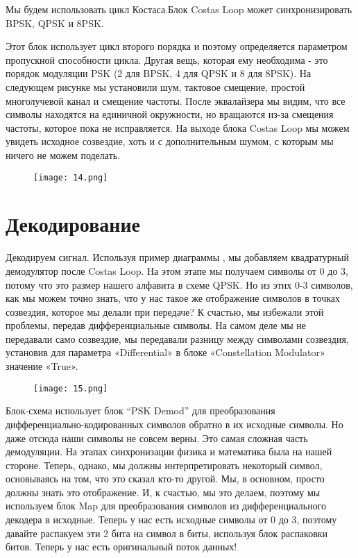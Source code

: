 \documentclass[a4paper,12pt]{report}
\begin{document}
Мы будем использовать цикл Костаса.Блок Costas Loop может синхронизировать BPSK, QPSK и 8PSK. 

Этот блок использует цикл второго порядка и поэтому определяется параметром пропускной способности цикла. Другая вещь, которая ему необходима - это порядок модуляции PSK (2 для BPSK, 4 для QPSK и 8 для 8PSK). На следующем рисунке мы установили шум, тактовое смещение, простой многолучевой канал и смещение частоты. После эквалайзера мы видим, что все символы находятся на единичной окружности, но вращаются из-за смещения частоты, которое пока не исправляется. На выходе блока Costas Loop мы можем увидеть исходное созвездие, хоть и с дополнительным шумом, с которым мы ничего не можем поделать. 

\begin{figure}[H]
        \centering
        \texttt{[image: 14.png]}
        \caption{}
        \label{fig:ig4_1}
\end{figure}

\section{Декодирование}

Декодируем сигнал. Используя пример диаграммы , мы добавляем квадратурный демодулятор после Costas Loop. На этом этапе мы получаем символы от 0 до 3, потому что это размер нашего алфавита в схеме QPSK. Но из этих 0-3 символов, как мы можем точно знать, что у нас такое же отображение символов в точках созвездия, которое мы делали при передаче? К счастью, мы избежали этой проблемы, передав дифференциальные символы. На самом деле мы не передавали само созвездие, мы передавали разницу между символами созвездия, установив для параметра «Differential» в блоке «Constellation Modulator» значение «True».  

\begin{figure}[H]
        \centering
        \texttt{[image: 15.png]}
        \caption{}
        \label{fig:ig4_1}
\end{figure}

Блок-схема использует блок “PSK Demod” для преобразования дифференциально-кодированных символов обратно в их исходные символы. Но даже отсюда наши символы не совсем верны. Это самая сложная часть демодуляции. На этапах синхронизации физика и математика была на нашей стороне. Теперь, однако, мы должны интерпретировать некоторый символ, основываясь на том, что это сказал кто-то другой. Мы, в основном, просто должны знать это отображение. И, к счастью, мы это делаем, поэтому мы используем блок Map для преобразования символов из дифференциального декодера в исходные. Теперь у нас есть исходные символы от 0 до 3, поэтому давайте распакуем эти 2 бита на символ в биты, используя блок распаковки битов. Теперь у нас есть оригинальный поток данных!  
\end{document}
